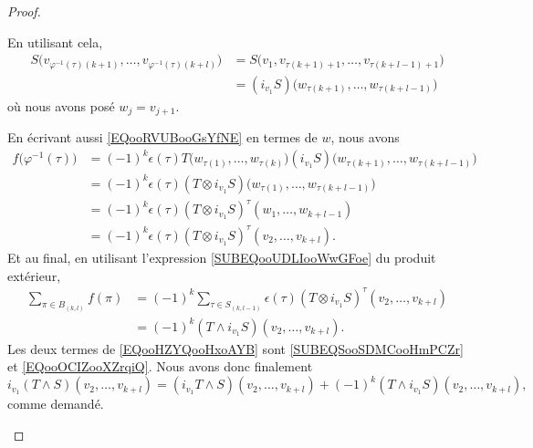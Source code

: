 \begin{proof}
\begin{subproof}
		En utilisant cela,
		\begin{subequations}
			\begin{align}
				S\big( v_{\varphi^{-1}(\tau)(k+1)},\ldots,v_{\varphi^{-1}(\tau)(k+l)} \big) & = S\big( v_1,v_{\tau(k+1)+1},\ldots,v_{\tau(k+l-1)+1} \big)  \\
				                                                                            & = (i_{v_1}S)\big( w_{\tau(k+1)},\ldots,w_{\tau(k+l-1)} \big)
			\end{align}
		\end{subequations}
		où nous avons posé \( w_j=v_{j+1}\).

		En écrivant aussi \eqref{EQooRVUBooGsYfNE} en termes de \( w\), nous avons
		\begin{subequations}
			\begin{align}
				f\big( \varphi^{-1}(\tau) \big) & =(-1)^k\epsilon(\tau)T\big( w_{\tau(1)},\ldots,w_{\tau(k)} \big)(i_{v_1}S)\big( w_{\tau(k+1)},\ldots,w_{\tau(k+l-1)} \big) \\
				                                & =(-1)^k\epsilon(\tau)(T\otimes i_{v_1}S)\big( w_{\tau(1)},\ldots,w_{\tau(k+l-1)} \big)                                     \\
				                                & = (-1)^k\epsilon(\tau)(T\otimes i_{v_1}S)^{\tau}(w_1,\ldots,w_{k+l-1})                                                     \\
				                                & = (-1)^k\epsilon(\tau)(T\otimes i_{v_1}S)^{\tau}(v_2,\ldots,v_{k+l}).
			\end{align}
		\end{subequations}
		Et au final, en utilisant l'expression \eqref{SUBEQooUDLIooWwGFoe} du produit extérieur,
		\begin{subequations}		\label{EQooOCIZooXZrqiQ}
			\begin{align}
				\sum_{\pi\in B_{(k,l)}}f(\pi) & =(-1)^k\sum_{\tau\in S_{(k,l-1)}}\epsilon(\tau)(T\otimes i_{v_1}S)^{\tau}(v_2,\ldots,v_{k+l}) \\
				                              & =(-1)^k(T\wedge i_{v_1}S)(v_2,\ldots,v_{k+l}).
			\end{align}
		\end{subequations}
		\spitem[Conclusion]
		Les deux termes de \eqref{EQooHZYQooHxoAYB} sont \eqref{SUBEQSooSDMCooHmPCZr} et \eqref{EQooOCIZooXZrqiQ}. Nous avons donc finalement
		\begin{equation}
			i_{v_1}(T\wedge S)(v_2,\ldots,v_{k+l})=(i_{v_1}T\wedge S)(v_2,\ldots,v_{k+l})+(-1)^k(T\wedge i_{v_1}S)(v_2,\ldots,v_{k+l}),
		\end{equation}
		comme demandé.
	\end{subproof}
\end{proof}

